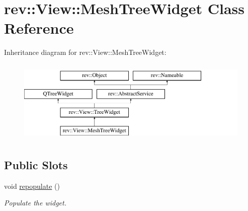 \hypertarget{classrev_1_1_view_1_1_mesh_tree_widget}{}\section{rev\+::View\+::Mesh\+Tree\+Widget Class Reference}
\label{classrev_1_1_view_1_1_mesh_tree_widget}
Inheritance diagram for rev\+::View\+::Mesh\+Tree\+Widget\+:\begin{figure}[H]
\begin{center}
\leavevmode
\includegraphics[height=4.000000cm]{classrev_1_1_view_1_1_mesh_tree_widget}
\end{center}
\end{figure}
\subsection*{Public Slots}
\begin{DoxyCompactItemize}
\item 
\mbox{\label{classrev_1_1_view_1_1_mesh_tree_widget_aed2aa1fd61f3d0ef8587d7bf76b7f3e4}} 
void \mbox{\hyperlink{classrev_1_1_view_1_1_mesh_tree_widget_aed2aa1fd61f3d0ef8587d7bf76b7f3e4}{repopulate}} ()
\begin{DoxyCompactList}\small\item\em Populate the widget. \end{DoxyCompactList}\end{DoxyCompactItemize}
